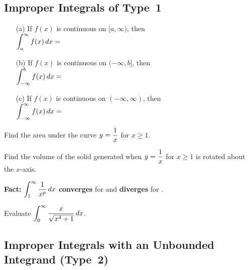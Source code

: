 \documentclass[12pt]{article}
\begin{document}
\subsection*{Improper Integrals of Type~1}

\begin{itemize}
\item[(a)] If $f(x)$ is continuous on $[a,\infty)$, then\\

$\displaystyle\int_a^\infty f(x)\,dx=$

\vfill

\item[(b)] If $f(x)$ is continuous on $(-\infty,b]$, then\\

$\displaystyle\int_{-\infty}^b f(x)\,dx=$

\vfill

\newpage

\item[(c)] If $f(x)$ is continuous on $(-\infty,\infty)$, then\\

$\displaystyle\int_{-\infty}^\infty f(x)\,dx=$

\vspace{40mm}

\end{itemize}

\Example Find the area under the curve $y=\displaystyle\frac{1}{x}$ for $x\geq 1$.

\newpage

\Example Find the volume of the solid generated when $y=\displaystyle\frac{1}{x}$ for $x\geq 1$ is rotated about the $x$-axis.

\vfill

\textbf{Fact:} $\displaystyle\int_1^\infty\frac{1}{x^p}\,dx$ \textbf{converges} for \underline{\hspace{30mm}} and \textbf{diverges} for \underline{\hspace{30mm}}.

\newpage

\Example Evaluate $\displaystyle\int_0^\infty \frac{x}{\sqrt{x^4+1}}\,dx$.

\newpage

\subsection*{Improper Integrals with an Unbounded Integrand (Type~2)}
\end{document}
